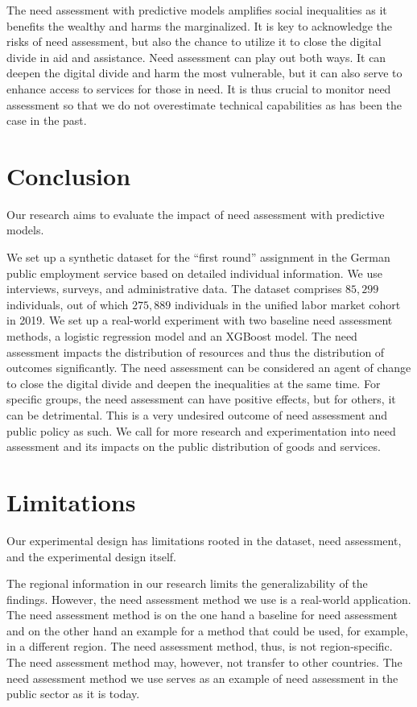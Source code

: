 The need assessment with predictive models amplifies social inequalities as it benefits the wealthy and harms the marginalized. It is key to acknowledge the risks of need assessment, but also the chance to utilize it to close the digital divide in aid and assistance. Need assessment can play out both ways. It can deepen the digital divide and harm the most vulnerable, but it can also serve to enhance access to services for those in need. It is thus crucial to monitor need assessment so that we do not overestimate technical capabilities as has been the case in the past.







\section{Conclusion}

Our research aims to evaluate the impact of need assessment with predictive models. 

We set up a synthetic dataset for the ``first round'' assignment in the German public employment service based on detailed individual information. We use interviews, surveys, and administrative data. The dataset comprises $85{,}299$ individuals, out of which $275{,}889$ individuals in the unified labor market cohort in 2019. We set up a real-world experiment with two baseline need assessment methods, a logistic regression model and an XGBoost model. The need assessment impacts the distribution of resources and thus the distribution of outcomes significantly. The need assessment can be considered an agent of change to close the digital divide and deepen the inequalities at the same time. For specific groups, the need assessment can have positive effects, but for others, it can be detrimental. This is a very undesired outcome of need assessment and public policy as such. We call for more research and experimentation into need assessment and its impacts on the public distribution of goods and services. 


\section{Limitations}

\label{sec:limitations}
Our experimental design has limitations rooted in the dataset, need assessment, and the experimental design itself.

The regional information in our research limits the generalizability of the findings. However, the need assessment method we use is a real-world application. The need assessment method is on the one hand a baseline for need assessment and on the other hand an example for a method that could be used, for example, in a different region. The need assessment method, thus, is not region-specific. The need assessment method may, however,  not transfer to other countries. The need assessment method we use serves as an example of need assessment in the public sector as it is today.

